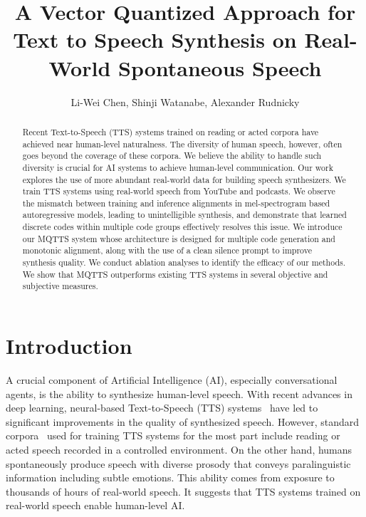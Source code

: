 \documentclass[letterpaper]{article}
\title{A Vector Quantized Approach for Text to Speech Synthesis on Real-World Spontaneous Speech}
\author{
    Li-Wei Chen,
    Shinji Watanabe,
    Alexander Rudnicky
}
\begin{document}
\maketitle

\begin{abstract}
  Recent Text-to-Speech (TTS) systems trained on reading or acted corpora have achieved near human-level naturalness.
  The diversity of human speech, however, often goes beyond the coverage of these corpora.
  We believe the ability to handle such diversity is crucial for AI systems to achieve human-level communication.
  Our work explores the use of more abundant real-world data for building speech synthesizers.
  We train TTS systems using real-world speech from YouTube and podcasts.
  We observe the mismatch between training and inference alignments in mel-spectrogram based autoregressive models, leading to unintelligible synthesis, and demonstrate that learned discrete codes within multiple code groups effectively resolves this issue.
  We introduce our MQTTS system whose architecture is designed for multiple code generation and monotonic alignment, along with the use of a clean silence prompt to improve synthesis quality.
  We conduct ablation analyses to identify the efficacy of our methods.
  We show that MQTTS outperforms existing TTS systems in several objective and subjective measures.
\end{abstract}

\section{Introduction}
\label{sec:intro}
A crucial component of Artificial Intelligence (AI), especially conversational agents, is the ability to synthesize human-level speech.
With recent advances in deep learning, neural-based Text-to-Speech (TTS) systems~\cite{Li_Liu_Liu_Zhao_Liu_2019,NEURIPS2020_5c3b99e8,NEURIPS2019_f63f65b5} have led to significant improvements in the quality of synthesized speech.
However, standard corpora~\cite{ljspeech17,VCTK} used for training TTS systems for the most part include reading or acted speech recorded in a controlled environment.
On the other hand, humans spontaneously produce speech with diverse prosody that conveys paralinguistic information including subtle emotions. This ability comes from exposure to thousands of hours of real-world speech.
It suggests that TTS systems trained on real-world speech enable human-level AI.
\end{document}
